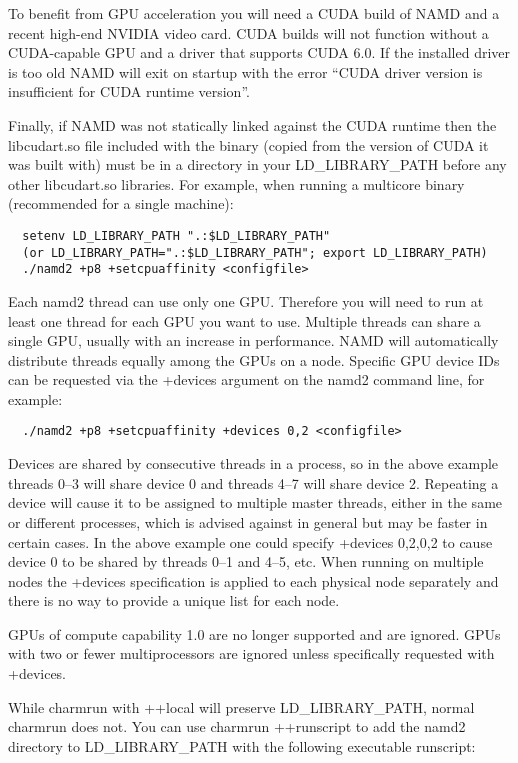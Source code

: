 To benefit from GPU acceleration you will need a CUDA build of NAMD
and a recent high-end NVIDIA video card.  CUDA builds will not function
without a CUDA-capable GPU and a driver that supports CUDA 6.0.  If the
installed driver is too old NAMD will exit on startup with the error
``CUDA driver version is insufficient for CUDA runtime version''.

Finally, if NAMD was not statically linked against the CUDA runtime
then the libcudart.so file included with the binary (copied from
the version of CUDA it was built with) must be in a directory in your
LD\_LIBRARY\_PATH before any other libcudart.so libraries.  For example,
when running a multicore binary (recommended for a single machine):

\begin{verbatim}
  setenv LD_LIBRARY_PATH ".:$LD_LIBRARY_PATH"
  (or LD_LIBRARY_PATH=".:$LD_LIBRARY_PATH"; export LD_LIBRARY_PATH)
  ./namd2 +p8 +setcpuaffinity <configfile>
\end{verbatim}

Each namd2 thread can use only one GPU.  Therefore you will need to run
at least one thread for each GPU you want to use.  Multiple threads
can share a single GPU, usually with an increase in performance.  NAMD
will automatically distribute threads equally among the GPUs on a node.
Specific GPU device IDs can be requested via the +devices argument on
the namd2 command line, for example:

\begin{verbatim}
  ./namd2 +p8 +setcpuaffinity +devices 0,2 <configfile>
\end{verbatim}

Devices are shared by consecutive threads in a process, so in the
above example threads 0--3 will share device 0 and threads 4--7 will
share device 2.  Repeating a device will cause it to be assigned to
multiple master threads, either in the same or different processes, which
is advised against in general but may be faster in certain cases.  In the
above example one could specify +devices 0,2,0,2 to cause device 0 to be
shared by threads 0--1 and 4--5, etc.  When running on multiple nodes the
+devices specification is applied to each physical node separately and
there is no way to provide a unique list for each node.

GPUs of compute capability 1.0 are no longer supported and are ignored.
GPUs with two or fewer multiprocessors are ignored unless specifically
requested with +devices.

While charmrun with ++local will preserve LD\_LIBRARY\_PATH, normal
charmrun does not.  You can use charmrun ++runscript to add the namd2
directory to LD\_LIBRARY\_PATH with the following executable runscript:

